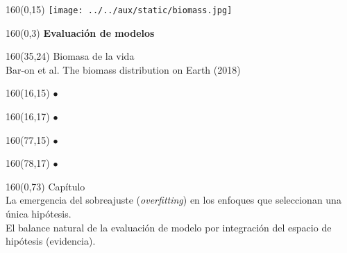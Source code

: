 \documentclass[shownotes,aspectratio=169]{beamer}
\newcounter{capitulo}
\newcommand{\unidad}{\thecapitulo \stepcounter{capitulo}}
\begin{document}
\begin{frame}
\begin{textblock}{160}(0,15) \centering
\texttt{[image: ../../aux/static/biomass.jpg]}
\end{textblock}

\begin{textblock}{160}(0,3) \centering
\LARGE \textcolor{black!90}{\fontsize{22}{0}\selectfont \textbf{Evaluación de modelos}}
\end{textblock}

\begin{textblock}{160}(35,24)
\textcolor{black!95}{\small Biomasa de la vida \\
\fontsize{2}{0}\selectfont \hspace{0.05cm} Bar-on et al. The biomass distribution on Earth (2018) \\}
\end{textblock}

\begin{textblock}{160}(16,15)
\LARGE \textcolor{black!0}{\fontsize{1200}{1200}\selectfont $\bm{\bullet}$ }
\end{textblock}
\begin{textblock}{160}(16,17)
\LARGE \textcolor{black!0}{\fontsize{1200}{1200}\selectfont $\bm{\bullet}$ }
\end{textblock}

\begin{textblock}{160}(77,15)
\LARGE \textcolor{black!0}{\fontsize{1200}{1200}\selectfont $\bm{\bullet}$ }
\end{textblock}
\begin{textblock}{160}(78,17)
\LARGE \textcolor{black!0}{\fontsize{1200}{1200}\selectfont $\bm{\bullet}$ }
\end{textblock}


\begin{textblock}{160}(0,73) \centering
\textcolor{black!95}{Capítulo \unidad \\ \small
La emergencia del sobreajuste (\emph{overfitting}) en los enfoques que seleccionan una única hipótesis. \\
El balance natural de la evaluación de modelo por integración del espacio de hipótesis (evidencia). \\
}
\end{textblock}


\end{frame}
\end{document}
